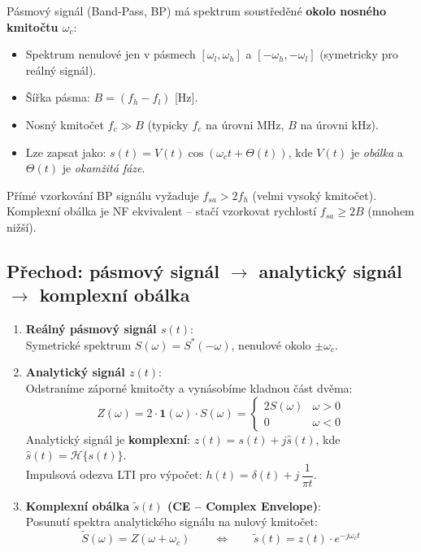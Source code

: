 \documentclass[12pt,a4paper]{article}
\begin{document}
Pásmový signál (Band-Pass, BP) má spektrum soustředěné \textbf{okolo nosného kmitočtu $\omega_c$}:

\begin{itemize}
  \item Spektrum nenulové jen v pásmech $[\omega_l, \omega_h]$ a $[-\omega_h, -\omega_l]$ (symetricky pro reálný signál).
  \item Šířka pásma: $B = (f_h - f_l)$ [Hz].
  \item Nosný kmitočet $f_c \gg B$ (typicky $f_c$ na úrovni MHz, $B$ na úrovni kHz).
  \item Lze zapsat jako: $s(t) = V(t)\cos(\omega_c t + \Theta(t))$, kde $V(t)$ je \emph{obálka} a $\Theta(t)$ je \emph{okamžitá fáze}.
\end{itemize}

\begin{noteBox}
Přímé vzorkování BP signálu vyžaduje $f_{sa} > 2f_h$ (velmi vysoký kmitočet). Komplexní obálka je NF ekvivalent – stačí vzorkovat rychlostí $f_{sa} \geq 2B$ (mnohem nižší).
\end{noteBox}

\begin{hvezdBox}
\subsection*{Přechod: pásmový signál $\to$ analytický signál $\to$ komplexní obálka}
\end{hvezdBox}

\begin{enumerate}
  \item \textbf{Reálný pásmový signál $s(t)$}:\\
    Symetrické spektrum $S(\omega) = S^*(-\omega)$, nenulové okolo $\pm\omega_c$.

  \item \textbf{Analytický signál $z(t)$}:\\
    Odstraníme záporné kmitočty a vynásobíme kladnou část dvěma:
    \[
      Z(\omega) = 2\cdot\mathbf{1}(\omega)\cdot S(\omega) = \begin{cases} 2S(\omega) & \omega > 0 \\ 0 & \omega < 0 \end{cases}
    \]
    Analytický signál je \textbf{komplexní}: $z(t) = s(t) + j\hat{s}(t)$, kde $\hat{s}(t) = \mathcal{H}\{s(t)\}$.\\
    Impulsová odezva LTI pro výpočet: $h(t) = \delta(t) + j\,\dfrac{1}{\pi t}$.

  \item \textbf{Komplexní obálka $\tilde{s}(t)$ (CE – Complex Envelope)}:\\
    Posunutí spektra analytického signálu na nulový kmitočet:
    \[
      \tilde{S}(\omega) = Z(\omega + \omega_c)
      \qquad \Leftrightarrow \qquad
      \tilde{s}(t) = z(t)\cdot e^{-j\omega_c t}
    \]
\end{enumerate}
\end{document}
